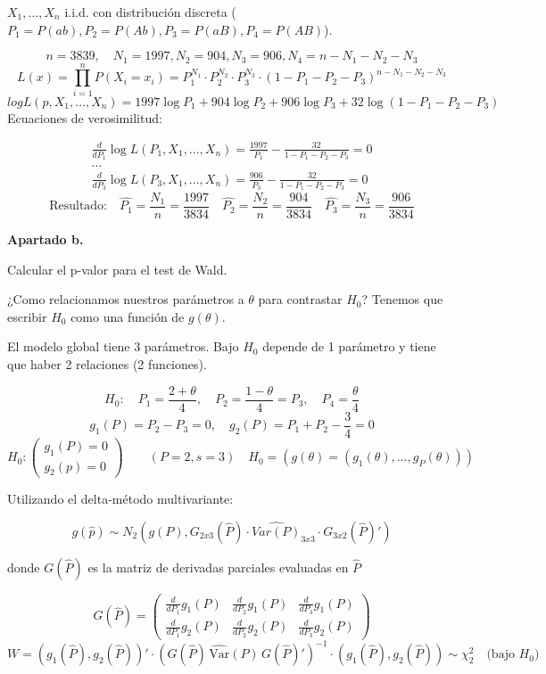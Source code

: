 $X_1,\dots,X_n$ i.i.d. con distribución discreta ($P_1=P(ab),P_2=P(Ab),P_3=P(aB),P_4=P(AB)$).

\[
n=3839, \quad N_1=1997,N_2=904, N_3=906, N_4=n-N_1-N_2-N_3
\]
\[
L(x)=\prod_{i=1}^{n}P(X_i=x_i)=P_1^{N_1}\cdot P_2^{N_2}\cdot P_3^{N_3}\cdot (1-P_1-P_2-P_3)^{n-N_1-N_2-N_3}
\]
\[
log L(p,X_1,\dots,X_n)=1997 \log P_1+ 904 \log P_2+906 \log P_3+32\log(1-P_1-P_2-P_3)
\]
\newpage
Ecuaciones de verosimilitud:

\[
\begin{matrix}
    \frac{d}{d P_1} \log L(P_1, X_1, \dots, X_n) = \frac{1997}{P_1} - \frac{32}{1 - P_1 - P_2 - P_3} = 0 \\[1em]
    \dots \\[1em]
    \frac{d}{d P_3} \log L(P_3, X_1, \dots, X_n) = \frac{906}{P_3} - \frac{32}{1 - P_1 - P_2 - P_3} = 0
\end{matrix}
\]
\[
    \text{Resultado:}\quad \hat{P_1}=\frac{N_1}{n}=\frac{1997}{3834} \quad \hat{P_2}=\frac{N_2}{n}=\frac{904}{3834} \quad \hat{P_3}=\frac{N_3}{n}=\frac{906}{3834}
\]

\textbf{Apartado b.}

Calcular el p-valor para el test de Wald.

¿Como relacionamos nuestros parámetros a $\theta$ para contrastar $H_0$? Tenemos que escribir $H_0$ como una función de $g(\theta)$.

El modelo global tiene 3 parámetros. Bajo $H_0$ depende de 1 parámetro y tiene que haber 2 relaciones (2 funciones).

\[
H_0: \quad P_1=\frac{2+\theta}{4}, \quad P_2=\frac{1-\theta}{4}=P_3, \quad P_4=\frac{\theta}{4}
\]\[g_1(P)=P_2-P_3=0, \quad g_2(P)=P_1+P_2-\frac{3}{4}=0
\]\[H_0:
\begin{pmatrix}
    g_1(P)=0 \\
    g_2(p)=0
\end{pmatrix} \qquad (P=2,s=3) \quad H_0=(g(\theta)=(g_1(\theta),\dots,g_P(\theta)))
\]

Utilizando el delta-método multivariante:

\[
g(\hat{p})\sim N_2(g(P),G_{2x3}(\hat{P})\cdot \hat{Var(P)}_{3x3} \cdot G_{3x2}(\hat{P})')
\]

donde $G(\hat{P})$ es la matriz de derivadas parciales evaluadas en $\hat{P}$

\[
G(\hat{P})=
\begin{pmatrix}
    \frac{d}{d P_1} g_1(P) & \frac{d}{d P_2} g_1(P) & \frac{d}{d P_3} g_1(P) \\
    \frac{d}{d P_1} g_2(P) & \frac{d}{d P_2} g_2(P) & \frac{d}{d P_3} g_2(P) 
\end{pmatrix}
\]
\[
W = \left( g_1(\hat{P}), g_2(\hat{P}) \right)' \cdot \left( G(\hat{P}) \, \hat{\text{Var}}(P) \, G(\hat{P})' \right)^{-1} \cdot \left( g_1(\hat{P}), g_2(\hat{P}) \right) \sim \chi^2_2 \quad \text{(bajo } H_0\text{)}
\]

